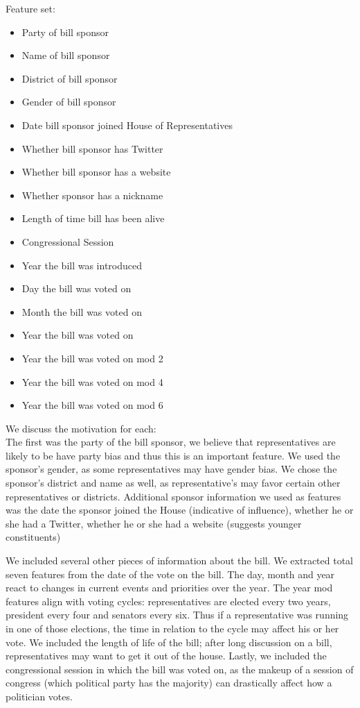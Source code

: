 \documentclass[11pt,letterpaper,twocolumn]{article}
\begin{document}
Feature set:
\begin{itemize}[noitemsep,topsep=0pt,parsep=0pt,partopsep=0pt]
\renewcommand\labelitemi{-}
\item Party of bill sponsor
\item Name of bill sponsor
\item District of bill sponsor
\item Gender of bill sponsor
\item Date bill sponsor joined House of Representatives
\item Whether bill sponsor has Twitter
\item Whether bill sponsor has a website
\item Whether sponsor has a nickname
\item Length of time bill has been alive
\item Congressional Session
\item Year the bill was introduced
\item Day the bill was voted on
\item Month the bill was voted on
\item Year the bill was voted on
\item Year the bill was voted on mod 2
\item Year the bill was voted on mod 4
\item Year the bill was voted on mod 6\\
\end{itemize}
	We discuss the motivation for each:\\
	
	 The first was the party of the bill sponsor, we believe that representatives are likely to be have party bias and thus this is an important feature. We used the sponsor's gender, as some representatives may have gender bias. We chose the sponsor's district and name as well, as representative's may favor certain other representatives or districts. Additional sponsor information we used as features was the date the sponsor joined the House (indicative of influence), whether he or she had a Twitter, whether he or she had a website (suggests younger constituents)
	
	We included several other pieces of information about the bill. We extracted total seven features from the date of the vote on the bill. The day, month and year react to changes in current events and priorities over the year. The year mod features align with voting cycles: representatives are elected every two years, president every four and senators every six. Thus if a representative was running in one of those elections, the time in relation to the cycle may affect his or her vote. We included the length of life of the bill; after long discussion on a bill, representatives may want to get it out of the house. Lastly, we included the congressional session in which the bill was voted on, as the makeup of a session of congress (which political party has the majority) can drastically affect how a politician votes. 
	
\end{document}

